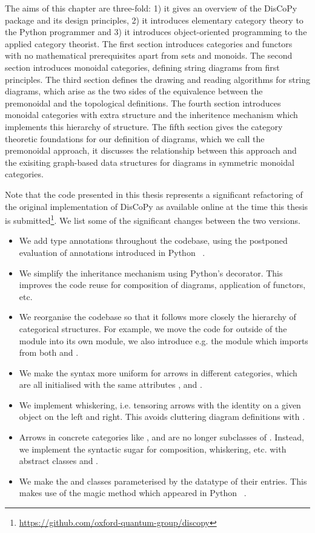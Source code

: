 The aims of this chapter are three-fold: 1) it gives an overview of the DisCoPy package and its design principles, 2) it introduces elementary category theory to the Python programmer and 3) it introduces object-oriented programming to the applied category theorist.
The first section introduces categories and functors with no mathematical prerequisites apart from sets and monoids.
The second section introduces monoidal categories, defining string diagrams from first principles.
The third section defines the drawing and reading algorithms for string diagrams, which arise as the two sides of the equivalence between the premonoidal and the topological definitions.
The fourth section introduces monoidal categories with extra structure and the inheritence mechanism which implements this hierarchy of structure.
The fifth section gives the category theoretic foundations for our definition of diagrams, which we call the premonoidal approach, it discusses the relationship between this approach and the exisiting graph-based data structures for diagrams in symmetric monoidal categories.

Note that the code presented in this thesis represents a significant refactoring of the original implementation of DisCoPy as available online at the time this thesis is submitted\footnote
{\url{https://github.com/oxford-quantum-group/discopy}}.
We list some of the significant changes between the two versions.
\begin{itemize}
\item We add type annotations throughout the codebase, using the postponed evaluation of annotations introduced in Python ~\cite{Langa17}.
\item We simplify the inheritance mechanism using Python's  decorator.
This improves the code reuse for composition of diagrams, application of functors, etc.
\item We reorganise the codebase so that it follows more closely the hierarchy of categorical structures.
For example, we move the code for  outside of the  module into its own  module, we also introduce e.g. the  module which imports from both  and .
\item We make the syntax more uniform for arrows in different categories, which are all initialised with the same attributes ,  and .
\item We implement whiskering, i.e. tensoring arrows with the identity on a given object on the left and right. This avoids cluttering diagram definitions with .
\item Arrows in concrete categories like ,  and  are no longer subclasses of . Instead, we implement the syntactic sugar for composition, whiskering, etc. with abstract classes  and .
\item We make the  and  classes parameterised by the datatype of their entries.
This makes use of the magic method  which appeared in Python ~\cite{Levkivskyi17}.
\end{itemize}
